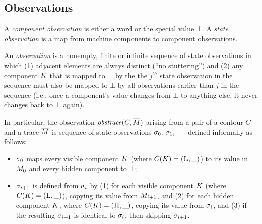 \documentclass[conference]{IEEEtran}
\begin{document}
\subsection{Observations}

A {\em component observation} is either a word or the special value $\bot$.
A {\em state observation} is a map from machine components to component
observations.
 
An {\em observation} is a nonempty, finite or infinite sequence of state
observations in which (1) adjacent elements are always distinct (``no
stuttering'') and (2) any component $K$ that is mapped to $\bot$ by
the the $j^{th}$ state observation in the sequence must also be mapped to
$\bot$ by all observations earlier than $j$ in the sequence (i.e., once a
component's value changes from $\bot$ to anything else, it never changes
back to $\bot$ again).
 
In particular, the observation $\mathit{obstrace}(C, \overline{M})$
arising from a pair of a contour $C$ and a trace $\overline{M}$
is sequence of state observations $\sigma_0,\, \sigma_1,\,
\ldots$ defined informally as follows:
\begin{itemize}
\item $\sigma_0$ maps every visible component $K$ (where
  $C(K) = (\textsc{L}, \_)$) to its value in $M_0$
  and every hidden component to $\bot$;
\item $\sigma_{i+1}$ is defined from $\sigma_{i}$ by (1) for
  each visible component $K$ (where $C(K) =
  (\textsc{L}, \_)$), copying its value from $M_{i+1}$, and (2) for
  each hidden component $K$, where $C (K) =
  (\textsc{H},\_)$, copying its value from $\sigma_{i}$, and (3) if
  the resulting $\sigma_{i+1}$ is identical to $\sigma_{i}$,
  then skipping $\sigma_{i+1}$.  \iftext{}\fi
\end{itemize}
\end{document}
